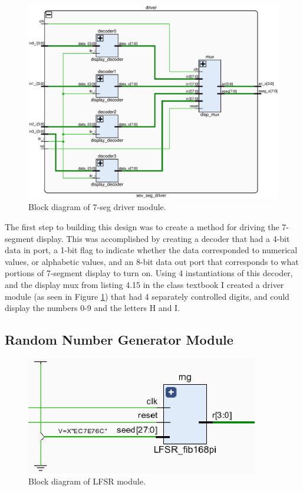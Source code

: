\documentclass[11pt]{article}
\begin{document}
\begin{figure}[H]
	\includegraphics [width=5in]{display_driver.eps}
	\centering
	\caption{Block diagram of 7-seg driver module.}
	\label{fig:7SegDriver}
\end{figure}

The first step to building this design was to create a method for driving the 7-segment display. This was accomplished by creating a decoder that had a 4-bit data in port, a 1-bit flag to indicate whether the data corresponded to numerical values, or alphabetic values, and an 8-bit data out port that corresponds to what portions of 7-segment display to turn on. Using 4 instantiations of this decoder, and the display mux from listing 4.15 in the class textbook I created a driver module (as seen in Figure \ref{fig:7SegDriver}) that had 4 separately controlled digits, and could display the numbers 0-9 and the letters H and I.

\subsection{Random Number Generator Module}

\begin{figure}[H]
\includegraphics [width=4in]{lfsr.eps}
	\centering
	\caption{Block diagram of LFSR module.}
	\label{fig:LFSRmod}
\end{figure}
\end{document}
